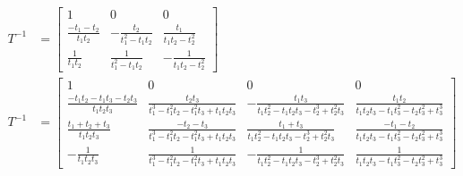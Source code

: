 \begin{align}
    T^{-1} &= \begin{bmatrix}
        1 & 0 & 0 \\
        \frac{- t_{1} - t_{2}}{t_{1} t_{2}} & - \frac{t_{2}}{t_{1}^{2} - t_{1} t_{2}} & \frac{t_{1}}{t_{1} t_{2} - t_{2}^{2}}\\
        \frac{1}{t_{1} t_{2}} & \frac{1}{t_{1}^{2} - t_{1} t_{2}} & - \frac{1}{t_{1} t_{2} - t_{2}^{2}}
    \end{bmatrix} \\
    T^{-1} &= \begin{bmatrix}
        1 & 0 & 0 & 0 \\
        \frac{- t_{1} t_{2} - t_{1} t_{3} - t_{2} t_{3}}{t_{1} t_{2} t_{3}} &
        \frac{t_{2} t_{3}}{t_{1}^{3} - t_{1}^{2} t_{2} - t_{1}^{2} t_{3} + t_{1} t_{2} t_{3}} &
        -\frac{t_{1} t_{3}}{t_{1} t_{2}^{2} - t_{1} t_{2} t_{3} - t_{2}^{3} + t_{2}^{2} t_{3}} &
        \frac{t_{1} t_{2}}{t_{1} t_{2} t_{3} - t_{1} t_{3}^{2} - t_{2} t_{3}^{2} + t_{3}^{3}} \\
        \frac{t_{1} + t_{2} + t_{3}}{t_{1} t_{2} t_{3}} &
        \frac{- t_{2} - t_{3}}{t_{1}^{3} - t_{1}^{2} t_{2} - t_{1}^{2} t_{3} + t_{1} t_{2} t_{3}} &
        \frac{t_{1} + t_{3}}{t_{1} t_{2}^{2} - t_{1} t_{2} t_{3} - t_{2}^{3} + t_{2}^{2} t_{3}} &
        \frac{- t_{1} - t_{2}}{t_{1} t_{2} t_{3} - t_{1} t_{3}^{2} - t_{2} t_{3}^{2} + t_{3}^{3}} \\
        -\frac{1}{t_{1} t_{2} t_{3}} &
        \frac{1}{t_{1}^{3} - t_{1}^{2} t_{2} - t_{1}^{2} t_{3} + t_{1} t_{2} t_{3}} &
        -\frac{1}{t_{1} t_{2}^{2} - t_{1} t_{2} t_{3} - t_{2}^{3} + t_{2}^{2} t_{3}} &
        \frac{1}{t_{1} t_{2} t_{3} - t_{1} t_{3}^{2} - t_{2} t_{3}^{2} + t_{3}^{3}}
    \end{bmatrix}
\end{align}

